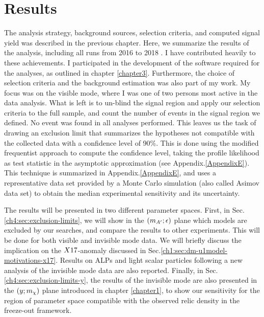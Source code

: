 
\newcommand{\pdirfour}{chapters/plots/chapter4}

\chapter{Results}

\label{chapter4}

The analysis strategy, background sources, selection criteria, and computed signal yield was described in the previous chapter. Here, we summarize the results of the analysis, including all runs from 2016 to 2018 \cite{Banerjee:2020fue,Banerjee:2019hmi,NA64:2019imj,na64-prd,Banerjee:2018vgk,Banerjee:2016tad}. I have contributed heavily to these achievements. I participated in the development of the software required for the analyses, as outlined in chapter \ref{chapter3}. Furthermore, the choice of selection criteria and the background estimation was also part of my work. My focus was on the visible mode, where I was one of two persons most active in the data analysis.
What is left is to un-blind the signal region and apply our selection criteria to the full sample, and count the number of events in the signal region we defined. No event was found in all analyses performed. This leaves us the task of drawing an exclusion limit that summarizes the hypotheses not compatible with the collected data with a confidence level of 90\%. This is done using the modified frequentist approach to compute the confidence level, taking the profile likelihood as test statistic in the asymptotic approximation (see Appendix.\ref{AppendixE}). This technique is summarized in Appendix.\ref{AppendixE}, and uses a representative data set provided by a Monte Carlo simulation (also called Asimov data set) to obtain the median experimental sensitivity and its uncertainty. 

The results will be presented in two different parameter spaces. First, in Sec.\ref{ch4:sec:exclusion-limits}, we will show in the $(m_{A'};\epsilon)$ plane which models are excluded by our searches, and compare the results to other experiments. This will be done for both visible and invisible mode data. We will briefly discuss the implication on the $X17$-anomaly discussed in Sec.\ref{ch1:sec:dm-u1model-motivations-x17}. Results on ALPs and light scalar particles following a new analysis of the invisible mode data are also reported. Finally, in Sec.\ref{ch4:sec:exclusion-limits-y}, the results of the invisible mode are also presented in the $(y;m_{\chi})$ plane introduced in chapter \ref{chapter1}, to show our sensitivity for the region of parameter space compatible with the observed relic density in the freeze-out framework.


